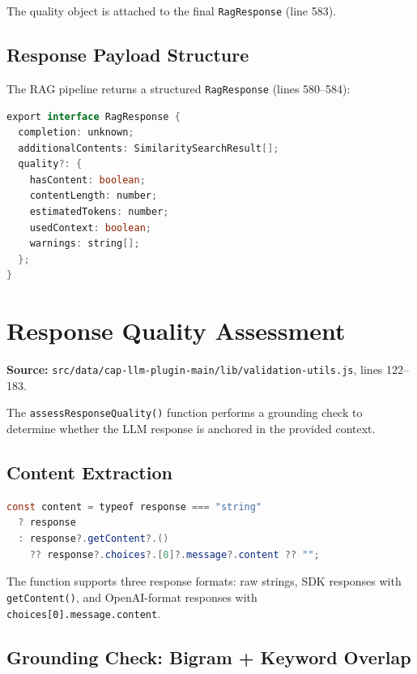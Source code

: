 \documentclass[11pt]{article}
\begin{document}
The quality object is attached to the final \texttt{RagResponse} (line 583).

\subsection{Response Payload Structure}

The RAG pipeline returns a structured \texttt{RagResponse} (lines 580--584):

\begin{lstlisting}[language=Java,caption={RagResponse interface --- lines 85--95}]
export interface RagResponse {
  completion: unknown;
  additionalContents: SimilaritySearchResult[];
  quality?: {
    hasContent: boolean;
    contentLength: number;
    estimatedTokens: number;
    usedContext: boolean;
    warnings: string[];
  };
}
\end{lstlisting}

\section{Response Quality Assessment}
\label{sec:quality-assessment}

\noindent\textbf{Source:}
\texttt{src/data/cap-llm-plugin-main/lib/validation-utils.js}, lines 122--183.

The \texttt{assessResponseQuality()} function performs a grounding check to
determine whether the LLM response is anchored in the provided context.

\subsection{Content Extraction}

\begin{lstlisting}[language=Java,caption={Content extraction --- lines 131--133}]
const content = typeof response === "string"
  ? response
  : response?.getContent?.()
    ?? response?.choices?.[0]?.message?.content ?? "";
\end{lstlisting}

The function supports three response formats: raw strings, SDK responses with
\texttt{getContent()}, and OpenAI-format responses with
\texttt{choices[0].message.content}.

\subsection{Grounding Check: Bigram + Keyword Overlap}
\end{document}
